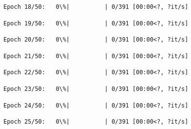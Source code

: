 \documentclass[11pt]{article}
\begin{document}
    
    
    \begin{Verbatim}[commandchars=\\\{\}]
Epoch 18/50:   0\%|          | 0/391 [00:00<?, ?it/s]
    \end{Verbatim}

    
    
    \begin{Verbatim}[commandchars=\\\{\}]
Epoch 19/50:   0\%|          | 0/391 [00:00<?, ?it/s]
    \end{Verbatim}

    
    
    \begin{Verbatim}[commandchars=\\\{\}]
Epoch 20/50:   0\%|          | 0/391 [00:00<?, ?it/s]
    \end{Verbatim}

    
    
    \begin{Verbatim}[commandchars=\\\{\}]
Epoch 21/50:   0\%|          | 0/391 [00:00<?, ?it/s]
    \end{Verbatim}

    
    
    \begin{Verbatim}[commandchars=\\\{\}]
Epoch 22/50:   0\%|          | 0/391 [00:00<?, ?it/s]
    \end{Verbatim}

    
    
    \begin{Verbatim}[commandchars=\\\{\}]
Epoch 23/50:   0\%|          | 0/391 [00:00<?, ?it/s]
    \end{Verbatim}

    
    
    \begin{Verbatim}[commandchars=\\\{\}]
Epoch 24/50:   0\%|          | 0/391 [00:00<?, ?it/s]
    \end{Verbatim}

    
    
    \begin{Verbatim}[commandchars=\\\{\}]
Epoch 25/50:   0\%|          | 0/391 [00:00<?, ?it/s]
    \end{Verbatim}
\end{document}
